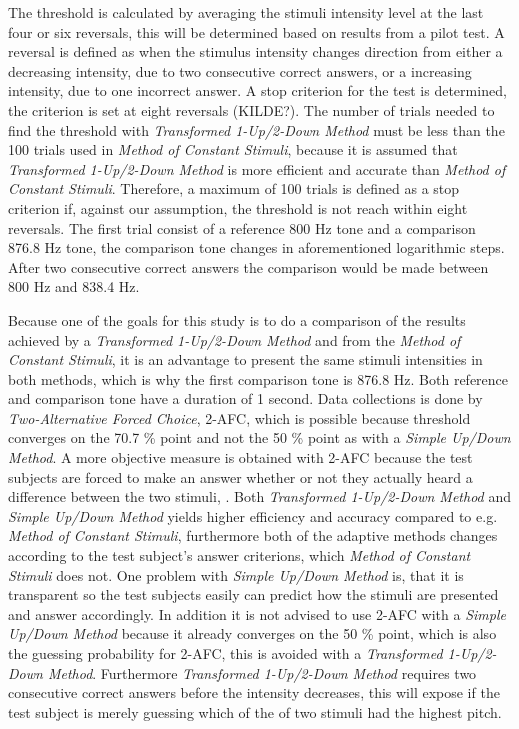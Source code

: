 \noindent
%
The threshold is calculated by averaging the stimuli intensity level at the last four or six reversals, this will be determined based on results from a pilot test. A reversal is defined as when the stimulus intensity changes direction from either a decreasing intensity, due to two consecutive correct answers, or a increasing intensity, due to one incorrect answer. A stop criterion for the test is determined, the criterion is set at eight reversals (KILDE?). The number of trials needed to find the threshold with  \textit{Transformed 1-Up/2-Down Method} must be less than the 100 trials used in \textit{Method of Constant Stimuli}, because it is assumed that \textit{Transformed 1-Up/2-Down Method} is more efficient and accurate than \textit{Method of Constant Stimuli}. Therefore, a maximum of 100 trials is defined as a stop criterion if, against our assumption, the threshold is not reach within eight reversals. The first trial consist of a reference 800 Hz tone and a comparison 876.8 Hz tone, the comparison tone changes in aforementioned logarithmic steps. After two consecutive correct answers the comparison would be made between 800 Hz and 838.4 Hz.

Because one of the goals for this study is to do a comparison of the results achieved by a \textit{Transformed 1-Up/2-Down Method} and from the \textit{Method of Constant Stimuli}, it is an advantage to present the same stimuli intensities in both methods, which is why the first comparison tone is 876.8 Hz. Both reference and comparison tone have a duration of 1 second.\blankline
%               
Data collections is done by \textit{Two-Alternative Forced Choice}, 2-AFC, which is possible because threshold converges on the 70.7 \% point and not the 50 \% point as with a \textit{Simple Up/Down Method}. A more objective measure is obtained with 2-AFC because the test subjects are forced to make an answer whether or not they actually heard a difference between the two stimuli, \parencite[p. 1219]{PDF:PsyphyMethods}.\blankline 
%
Both \textit{Transformed 1-Up/2-Down Method} and \textit{Simple Up/Down Method} yields higher efficiency and accuracy compared to e.g. \textit{Method of Constant Stimuli}, furthermore both of the adaptive methods changes according to the test subject's answer criterions, which \textit{Method of Constant Stimuli} does not. One problem with \textit{Simple Up/Down Method} is, that it is transparent so the test subjects easily can predict how the stimuli are presented and answer accordingly. In addition it is not advised to use 2-AFC with a \textit{Simple Up/Down Method} because it already converges on the 50 \% point, which is also the guessing probability for 2-AFC, this is avoided with a \textit{Transformed 1-Up/2-Down Method}. Furthermore \textit{Transformed 1-Up/2-Down Method} requires two consecutive correct answers before the intensity decreases, this will expose if the test subject is merely guessing which of the of two stimuli had the highest pitch. 

